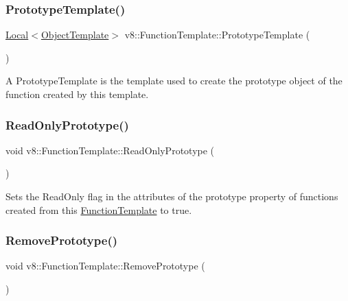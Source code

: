 \subsubsection{\texorpdfstring{Prototype\+Template()}{PrototypeTemplate()}}
{\footnotesize\ttfamily \mbox{\hyperlink{classv8_1_1Local}{Local}}$<$\mbox{\hyperlink{classv8_1_1ObjectTemplate}{Object\+Template}}$>$ v8\+::\+Function\+Template\+::\+Prototype\+Template (\begin{DoxyParamCaption}{ }\end{DoxyParamCaption})}

A Prototype\+Template is the template used to create the prototype object of the function created by this template. \mbox{\label{classv8_1_1FunctionTemplate_a91d2e0643e8c5a53ab1d75f7766c2422}} 
\subsubsection{\texorpdfstring{Read\+Only\+Prototype()}{ReadOnlyPrototype()}}
{\footnotesize\ttfamily void v8\+::\+Function\+Template\+::\+Read\+Only\+Prototype (\begin{DoxyParamCaption}{ }\end{DoxyParamCaption})}

Sets the Read\+Only flag in the attributes of the \textquotesingle{}prototype\textquotesingle{} property of functions created from this \mbox{\hyperlink{classv8_1_1FunctionTemplate}{Function\+Template}} to true. \mbox{\label{classv8_1_1FunctionTemplate_a4a184aca244174c7fe52d58871d3129e}} 
\subsubsection{\texorpdfstring{Remove\+Prototype()}{RemovePrototype()}}
{\footnotesize\ttfamily void v8\+::\+Function\+Template\+::\+Remove\+Prototype (\begin{DoxyParamCaption}{ }\end{DoxyParamCaption})}

